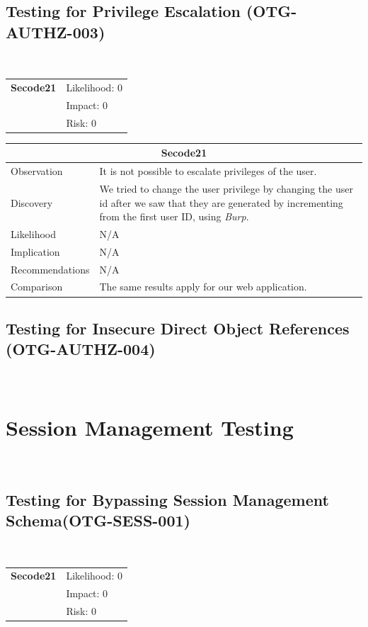 \documentclass[headsepline,footsepline,footinclude=false,oneside,fontsize=11pt,paper=a4,listof=totoc,bibliography=totoc]{scrbook} %
\begin{document}
\subsection{Testing for Privilege Escalation (OTG-AUTHZ-003)}\

\begin{tabular}{cR{12cm}}
	\textbf{Secode21} & Likelihood: 0\\& Impact: 0\\& Risk: 0
\end{tabular}

\begin{tabular}{ l|p{11cm}  }
	\hline
	\multicolumn{2}{c}{\textbf{Secode21}} \\
	\hline
	Observation   & It is not possible to escalate privileges of the user.  \\
	Discovery  & We tried to change the user privilege by changing the user id after we saw that they are generated by incrementing from the first user ID, using \textit{Burp}.\\
	Likelihood & N/A \\
	Implication    & N/A \\
	Recommendations & N/A \\
	Comparison & The same results apply for our web application.\\
	\hline
\end{tabular}

\pagebreak
\subsection{Testing for Insecure Direct Object References (OTG-AUTHZ-004)}\

\pagebreak
\section{Session Management Testing}\
\subsection{Testing for Bypassing Session Management Schema(OTG-SESS-001)}\

\begin{tabular}{cR{12cm}}
	\textbf{Secode21} & Likelihood: 0\\& Impact: 0\\& Risk: 0
\end{tabular}
\end{document}
